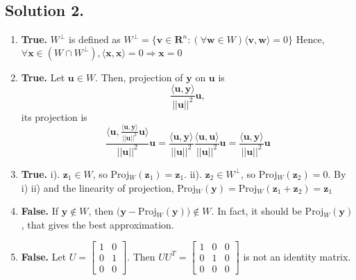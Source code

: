\documentclass{article}
\begin{document}
\subsection*{Solution 2.}
\begin{enumerate} [label=(\arabic*)]
    \item \textbf{True.}\newline
$W^\perp$ is defined as
$W^\perp =\{\mathbf{v}\in\mathbf{R}^n:(\forall \mathbf{w}\in W) \langle \mathbf{v},\mathbf{w}\rangle=0\}$ \newline
Hence, $\forall \mathbf{x}\in (W\cap W^\perp),\langle \mathbf{x},\mathbf{x}\rangle=0\Rightarrow \mathbf{x}=0$
    \item \textbf{True.} \newline
    Let $\mathbf{u}\in W$. Then, projection of $\mathbf{y}$ on $\mathbf{u}$ is 
    \[\frac{\langle\mathbf{u},\mathbf{y}\rangle}{||\mathbf{u}||^2}\mathbf{u},\]
    its projection is 
    \[\frac{\langle\mathbf{u},\frac{\langle\mathbf{u},\mathbf{y}\rangle}{||\mathbf{u}||^2}\mathbf{u}\rangle}{||\mathbf{u}||^2}\mathbf{u}=\frac{\langle\mathbf{u},\mathbf{y}\rangle}{||\mathbf{u}||^2}\frac{\langle\mathbf{u},\mathbf{u}\rangle}{||\mathbf{u}||^2}\mathbf{u}=\frac{\langle\mathbf{u},\mathbf{y}\rangle}{||\mathbf{u}||^2}\mathbf{u}\]
    \item \textbf{True.} \newline
    i). $\mathbf{z}_1\in W$, so Proj$_W(\mathbf{z}_1)=\mathbf{z}_1$.\newline
    ii). $\mathbf{z}_2\in W^\perp$, so Proj$_W(\mathbf{z}_2)=0$.\newline
    By i) ii) and the linearity of projection, \newline
    Proj$_W(\mathbf{y})=$Proj$_W(\mathbf{z}_1+\mathbf{z}_2)=\mathbf{z}_1$
    \item \textbf{False.} 
    If $\mathbf{y}\notin W$, then $(\mathbf{y}-$Proj$_W(\mathbf{y}))\notin W$. In fact, it should be Proj$_W(\mathbf{y})$, that gives the best approximation.
    \item \textbf{False.} 
    Let $U=\left[
\begin{array}{rr}
 1 &  0 \\
 0 &  1 \\
 0 &  0
\end{array}
\right]$. Then $UU^T=\left[
\begin{array}{rrr}
 1 &  0 & 0\\
 0 &  1 & 0\\
 0 &  0 & 0 
\end{array}
\right]$ is not an identity matrix.
\end{enumerate}
\end{document}
